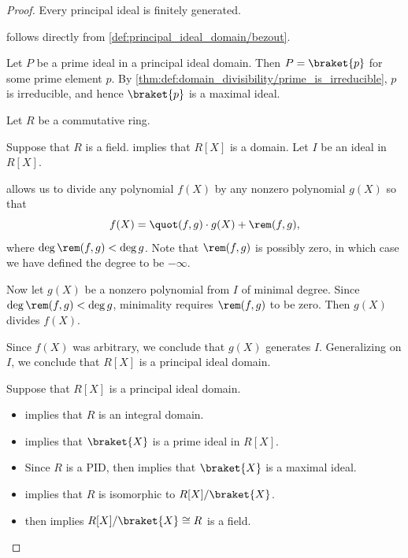 \begin{proof}
   Every principal ideal is finitely generated.

    follows directly from \cref{def:principal_ideal_domain/bezout}.

   Let \( P \) be a prime ideal in a principal ideal domain. Then \( P = \braket{ p } \) for some prime element \( p \). By \cref{thm:def:domain_divisibility/prime_is_irreducible}, \( p \) is irreducible, and hence \( \braket{ p } \) is a maximal ideal.

   Let \( R \) be a commutative ring.

  \SufficiencySubProof* Suppose that \( R \) is a field.  implies that \( R[X] \) is a domain. Let \( I \) be an ideal in \( R[X] \).

   allows us to divide any polynomial \( f(X) \) by any nonzero polynomial \( g(X) \) so that
  \begin{equation*}
    f(X) = \quot(f, g) \cdot g(X) + \rem(f, g),
  \end{equation*}
  where \( \deg \rem(f, g) < \deg g \). Note that \( \rem(f, g) \) is possibly zero, in which case we have defined the degree to be \( -\infty \).

  Now let \( g(X) \) be a nonzero polynomial from \( I \) of minimal degree. Since \( \deg \rem(f, g) < \deg g \), minimality requires \( \rem(f, g) \) to be zero. Then \( g(X) \) divides \( f(X) \).

  Since \( f(X) \) was arbitrary, we conclude that \( g(X) \) generates \( I \). Generalizing on \( I \), we conclude that \( R[X] \) is a principal ideal domain.

  \NecessitySubProof* Suppose that \( R[X] \) is a principal ideal domain.
  \begin{itemize}
    \item {} implies that \( R \) is an integral domain.
    \item {} implies that \( \braket{ X } \) is a prime ideal in \( R[X] \).
    \item Since \( R \) is a PID,  then implies that \( \braket{ X } \) is a maximal ideal.
    \item {} implies that \( R \) is isomorphic to \( R[X] / \braket{ X } \).
    \item {} then implies \( R[X] / \braket{ X } \cong R \) is a field.
  \end{itemize}
\end{proof}

